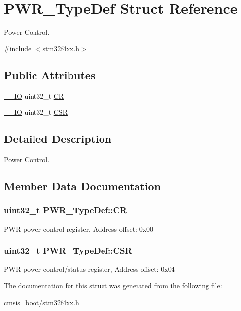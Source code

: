 \hypertarget{struct_p_w_r___type_def}{}\section{P\+W\+R\+\_\+\+Type\+Def Struct Reference}
\label{struct_p_w_r___type_def}


Power Control.  




{\ttfamily \#include $<$stm32f4xx.\+h$>$}

\subsection*{Public Attributes}
\begin{DoxyCompactItemize}
\item 
\hyperlink{core__cm4_8h_aec43007d9998a0a0e01faede4133d6be}{\+\_\+\+\_\+\+IO} uint32\+\_\+t \hyperlink{struct_p_w_r___type_def_aeb6bcdb2b99d58b9a0ffd86deb606eac}{CR}
\item 
\hyperlink{core__cm4_8h_aec43007d9998a0a0e01faede4133d6be}{\+\_\+\+\_\+\+IO} uint32\+\_\+t \hyperlink{struct_p_w_r___type_def_ae17097e69c88b6c00033d6fb84a8182b}{C\+SR}
\end{DoxyCompactItemize}


\subsection{Detailed Description}
Power Control. 

\subsection{Member Data Documentation}
\subsubsection[{\texorpdfstring{CR}{CR}}]{ uint32\+\_\+t P\+W\+R\+\_\+\+Type\+Def\+::\+CR}\hypertarget{struct_p_w_r___type_def_aeb6bcdb2b99d58b9a0ffd86deb606eac}{}\label{struct_p_w_r___type_def_aeb6bcdb2b99d58b9a0ffd86deb606eac}
P\+WR power control register, Address offset\+: 0x00 
\subsubsection[{\texorpdfstring{C\+SR}{CSR}}]{ uint32\+\_\+t P\+W\+R\+\_\+\+Type\+Def\+::\+C\+SR}\hypertarget{struct_p_w_r___type_def_ae17097e69c88b6c00033d6fb84a8182b}{}\label{struct_p_w_r___type_def_ae17097e69c88b6c00033d6fb84a8182b}
P\+WR power control/status register, Address offset\+: 0x04 

The documentation for this struct was generated from the following file\+:\begin{DoxyCompactItemize}
\item 
cmsis\+\_\+boot/\hyperlink{stm32f4xx_8h}{stm32f4xx.\+h}\end{DoxyCompactItemize}

